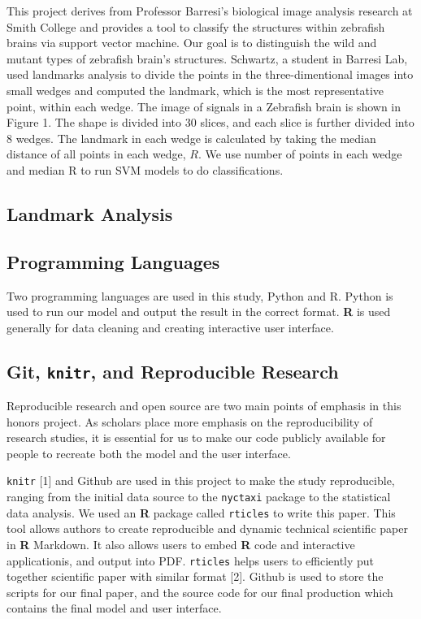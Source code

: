 \documentclass[10pt,letterpaper]{article}
\begin{document}
This project derives from Professor Barresi's biological image analysis
research at Smith College and provides a tool to classify the structures
within zebrafish brains via support vector machine. Our goal is to
distinguish the wild and mutant types of zebrafish brain's structures.
Schwartz, a student in Barresi Lab, used landmarks analysis to divide
the points in the three-dimentional images into small wedges and
computed the landmark, which is the most representative point, within
each wedge. The image of signals in a Zebrafish brain is shown in Figure
1. The shape is divided into 30 slices, and each slice is further
divided into 8 wedges. The landmark in each wedge is calculated by
taking the median distance of all points in each wedge, \(R\). We use
number of points in each wedge and median R to run SVM models to do
classifications.

\subsection{Landmark Analysis}\label{landmark-analysis}

\subsection{Programming Languages}\label{programming-languages}

Two programming languages are used in this study, Python and R. Python
is used to run our model and output the result in the correct format.
\textbf{R} is used generally for data cleaning and creating interactive
user interface.

\subsection{\texorpdfstring{Git, \texttt{knitr}, and Reproducible
Research}{Git, knitr, and Reproducible Research}}\label{git-knitr-and-reproducible-research}

Reproducible research and open source are two main points of emphasis in
this honors project. As scholars place more emphasis on the
reproducibility of research studies, it is essential for us to make our
code publicly available for people to recreate both the model and the
user interface.

\texttt{knitr} {[}1{]} and Github are used in this project to make the
study reproducible, ranging from the initial data source to the
\texttt{nyctaxi} package to the statistical data analysis. We used an
\textbf{R} package called \texttt{rticles} to write this paper. This
tool allows authors to create reproducible and dynamic technical
scientific paper in \textbf{R} Markdown. It also allows users to embed
\textbf{R} code and interactive applicationis, and output into PDF.
\texttt{rticles} helps users to efficiently put together scientific
paper with similar format {[}2{]}. Github is used to store the scripts
for our final paper, and the source code for our final production which
contains the final model and user interface.
\end{document}
